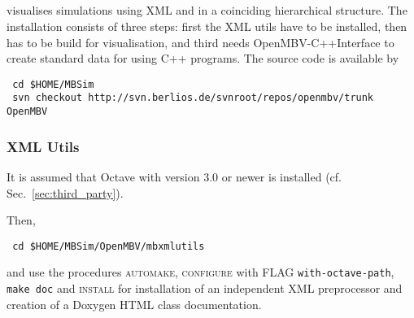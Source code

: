 \subsection{\OpenMBV{}}
\OpenMBV{} visualises \MBSim{} simulations using XML and \HDF{} in a coinciding hierarchical structure. The installation consists of three steps: first the XML utils have to be installed, then \OpenMBV{} has to be build for visualisation, and third \MBSim{} needs \textsf{OpenMBV-C++Interface} to create standard data for \OpenMBV{} using C++ programs. The source code is available by
\begin{verbatim}
 cd $HOME/MBSim
 svn checkout http://svn.berlios.de/svnroot/repos/openmbv/trunk OpenMBV
\end{verbatim}

\subsubsection{XML Utils}
It is assumed that Octave with version 3.0 or newer is installed (cf. Sec.~\ref{sec:third_party}).\par
Then,
\begin{verbatim}
 cd $HOME/MBSim/OpenMBV/mbxmlutils
\end{verbatim} 
and use the procedures \textsc{automake}, \textsc{configure} with FLAG \texttt{\-\-with-octave-path}, \texttt{make doc} and \textsc{install} for installation of an independent XML preprocessor and creation of a Doxygen HTML class documentation. 

